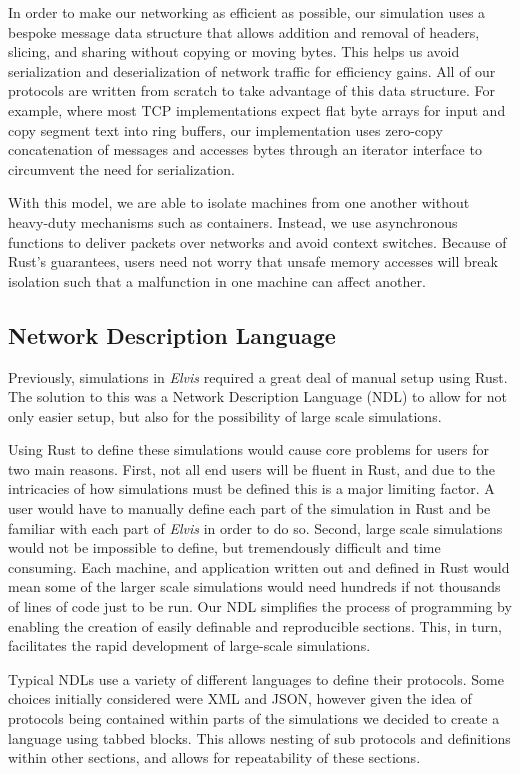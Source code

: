 \documentclass[journal]{IEEEtran} %
\newcommand{\elvis}{\textit{Elvis}}
\begin{document}
In order to make our networking as efficient as possible, our simulation uses a bespoke message data structure that allows addition and removal of headers, slicing, and sharing without copying or moving bytes. This helps us avoid serialization and deserialization of network traffic for efficiency gains. All of our protocols are written from scratch to take advantage of this data structure. For example, where most TCP implementations expect flat byte arrays for input and copy segment text into ring buffers, our implementation uses zero-copy concatenation of messages and accesses bytes through an iterator interface to circumvent the need for serialization.

With this model, we are able to isolate machines from one another without heavy-duty mechanisms such as containers. Instead, we use asynchronous functions to deliver packets over networks and avoid context switches. Because of Rust’s guarantees, users need not worry that unsafe memory accesses will break isolation such that a malfunction in one machine can affect another.


\subsection{Network Description Language}

Previously, simulations in \elvis{} required a great deal of manual setup using Rust. The solution to this was a Network Description Language (NDL) to allow for not only easier setup, but also for the possibility of large scale simulations.

Using Rust to define these simulations would cause core problems for users for two main reasons. First, not all end users will be fluent in Rust, and due to the intricacies of how simulations must be defined this is a major limiting factor. A user would have to manually define each part of the simulation in Rust and be familiar with each part of \elvis{} in order to do so. Second, large scale simulations would not be impossible to define, but tremendously difficult and time consuming. Each machine, and application written out and defined in Rust would mean some of the larger scale simulations would need hundreds if not thousands of lines of code just to be run. Our NDL simplifies the process of programming by enabling the creation of easily definable and reproducible sections. This, in turn, facilitates the rapid development of large-scale simulations.

Typical NDLs use a variety of different languages to define their protocols. Some choices initially considered were XML and JSON, however given the idea of protocols being contained within parts of the simulations we decided to create a language using tabbed blocks. This allows nesting of sub protocols and definitions within other sections, and allows for repeatability of these sections.
\end{document}
